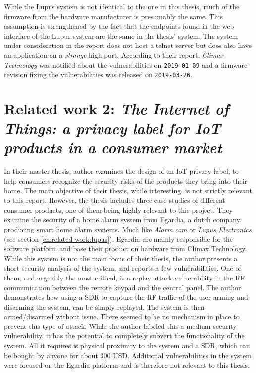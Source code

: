 While the Lupus system is not identical to the one in this thesis, much of the firmware from the hardware manufacturer is presumably the same. This assumption is strengthened by the fact that the endpoints found in the web interface of the Lupus system are the same in the thesis' system. The system under consideration in the report does not host a telnet server but does also have an application on a \textit{strange} high port. According to their report, \textit{Climax Technology} was notified about the vulnerabilities on \texttt{2019-01-09} and a firmware revision fixing the vulnerabilities was released on \texttt{2019-03-26}.

\section{Related work 2: \textit{The Internet of Things: a privacy label for IoT products in a consumer market}}
In their master thesis, author \citeauthor{iotprivacylabel} examines the design of an IoT privacy label, to help consumers recognize the security risks of the products they bring into their home. The main objective of their thesis, while interesting, is not strictly relevant to this report. However, the thesis includes three case studies of different consumer products, one of them being highly relevant to this project. They examine the security of a home alarm system from Egardia, a dutch company producing smart home alarm systems. Much like \textit{Alarm.com} or \textit{Lupus Electronics} (see section \ref{ch:related-work:lupus}), Egardia are mainly responsible for the software platform and base their product on hardware from Climax Technology. While this system is not the main focus of their thesis, the author presents a short security analysis of the system, and reports a few vulnerabilities. One of them, and arguably the most critical, is a replay attack vulnerability in the \gls{RF} communication between the remote keypad and the central panel. The author demonstrates how using a \gls{SDR} to capture the \gls{RF} traffic of the user arming and disarming the system, can be simply replayed. The system is then armed/disarmed without issue. There seemed to be no mechanism in place to prevent this type of attack. While the author labeled this a medium security vulnerability, it has the potential to completely subvert the functionality of the system. All it requires is physical proximity to the system and a \gls{SDR}, which can be bought by anyone for about 300 USD. Additional vulnerabilities in the system were focused on the Egardia platform and is therefore not relevant to this thesis.

